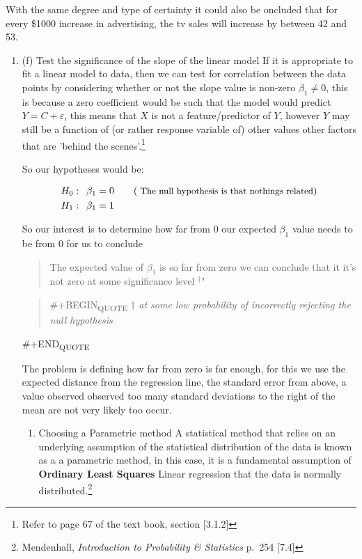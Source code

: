 \documentclass[11pt]{article}
\begin{document}
With the same degree and type of certainty it could also be oncluded
that for every \$1000 increase in advertising, the tv sales will increase
by between 42 and 53.
\begin{enumerate}
\item (f) Test the significance of the slope of the linear model
\label{sec:orgc6ada8f}
If it is appropriate to fit a linear model to data, then we can test for
correlation between the data points by considering whether or not the
slope value is non-zero \(\beta_1 \neq 0\), this is because a zero
coefficient would be such that the model would predict
\(Y = C + \varepsilon\), this means that \(X\) is not a feature/predictor of
\(Y\), however \(Y\) may still be a function of (or rather response variable
of) other values other factors that are 'behind the scenes'.\footnote{Refer to page 67 of the text book, section [3.1.2]}

So our hypotheses would be:

\begin{align}
H_0 : \enspace \beta_1 &= 0 \qquad ( \small {\text{ The null hypothesis is that nothings related}})\\
H_1 : \enspace \beta_1 &= 1
\end{align}

So our interest is to determine how far from 0 our expected \(\beta_1\)
value needs to be from 0 for us to conclude

\begin{quote}
The expected value of \(\beta_1\) is so far from zero we can conclude
that it it's not zero at some significance level \(^{\dagger}\)"
\end{quote}

\begin{quote}


\#+BEGIN\textsubscript{QUOTE}
  \emph{\(\dagger\) at some low probability of incorrectly rejecting the null
  hypothesis}
\end{quote}
\#+END\textsubscript{QUOTE}

The problem is defining how far from zero is far enough, for this we use
the expected distance from the regression line, the standard error from
above, a value observed observed too many standard deviations to the
right of the mean are not very likely too occur.
\begin{enumerate}
\item Choosing a Parametric method
\label{sec:orgc595d81}
A statistical method that relies on an underlying assumption of the
statistical distribution of the data is known as a a parametric method,
in this case, it is a fundamental assumption of \textbf{Ordinary Least Squares}
Linear regression that the data is normally distributed.\footnote{Mendenhall, \emph{Introduction to Probability \& Statistics} p. 254
[7.4]}


\end{enumerate}
\end{enumerate}
\end{document}
